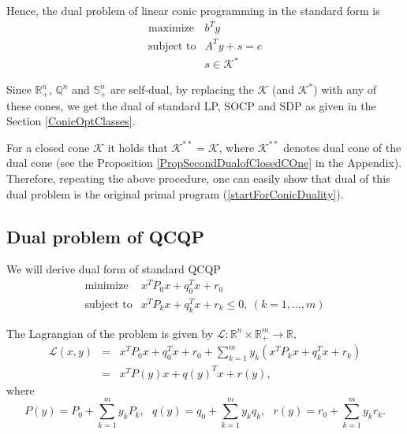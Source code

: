 \documentclass[12pt]{book}
\theoremstyle{definition}
\begin{document}
Hence, the dual problem of linear conic programming in the standard form is 
\begin{equation*}
 \begin{array}{ll}
\mbox{maximize} & b^Ty\\
\mbox{subject to}& A^Ty + s = c\\
& s \in \mathcal{K}^*
\end{array}
\end{equation*}

Since $\mathbb{R}^n_+$, $\mathbb{Q}^n$ and $\mathbb{S}^n_+$ are self-dual, by replacing the $\mathcal{K}$ (and $\mathcal{K}^*$) with any of these cones, we get 
the dual of standard LP, SOCP and SDP as given in the Section \ref{ConicOptClasses}.


\rem \label{doubleDualConeProg} For a closed cone $\mathcal{K}$ it holds that $\mathcal{K}^{**} = \mathcal{K}$, where $\mathcal{K}^{**}$ denotes dual cone of the dual cone (see the Proposition \ref{PropSecondDualofClosedCOne} in the Appendix). Therefore, repeating the above procedure, one can easily show that dual of this dual problem is the original primal program (\ref{startForConicDuality}).




\subsection{Dual problem of QCQP}


We will derive dual form of standard QCQP
\begin{equation*}
\begin{array}{ll}
\mbox{minimize}& x^TP_0x + q_0^Tx + r_0 \\
\mbox{subject to}& x^TP_kx + q_k^Tx + r_k \leq 0, \  (k = 1,\dots ,m)
\end{array} 
\end{equation*}

The Lagrangian of the problem is given by $\mathcal{L}: \mathbb{R}^n\times\mathbb{R}^m_+ \rightarrow \mathbb{R},$
\begin{eqnarray*}
\mathcal{L}(x,y) &=&  x^TP_0x + q_0^Tx + r_0 + \sum_{k=1}^m y_k(x^TP_kx + q_k^Tx + r_k) \\
 &=& x^TP(y)x + q(y)^Tx + r(y),
\end{eqnarray*}
where %
\begin{equation*} 
P(y) = P_0 + \sum_{k = 1}^m y_kP_k, \ \ \  q(y) = q_0 + \sum_{k = 1}^m y_kq_k, \ \ \ r(y) = r_0 + \sum_{k =1}^m y_kr_k. 
\end{equation*}
\end{document}
